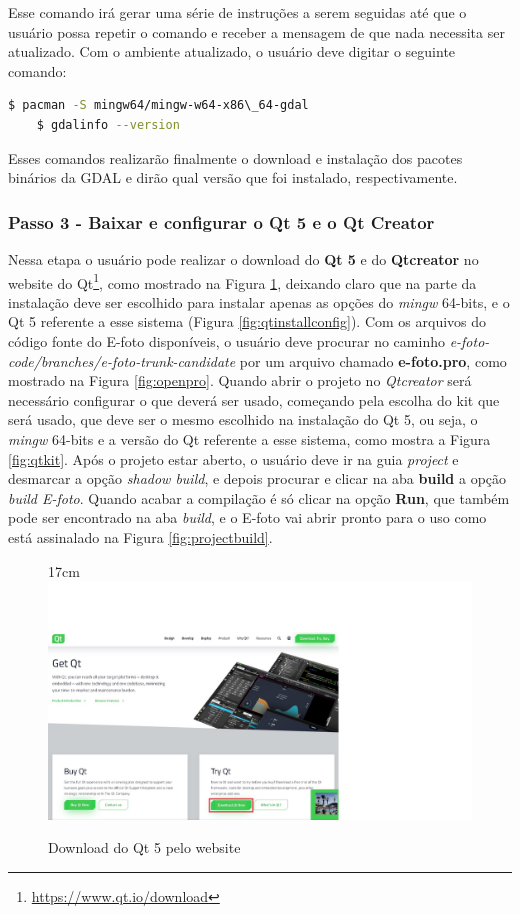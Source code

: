 Esse comando irá gerar uma série de instruções a serem seguidas até que o usuário possa repetir o comando e receber a mensagem de que nada necessita ser atualizado. Com o ambiente atualizado, o usuário deve digitar o seguinte comando:
\begin{lstlisting}[language=bash]
 	$ pacman -S mingw64/mingw-w64-x86\_64-gdal
 	$ gdalinfo --version
\end{lstlisting}

Esses comandos realizarão finalmente o download e instalação dos pacotes binários da GDAL e dirão qual versão que foi instalado, respectivamente. 
 
\subsubsection{Passo 3 - Baixar e configurar o Qt 5 e o Qt Creator}
Nessa etapa o usuário pode realizar o download do \textbf{Qt 5} e do \textbf{Qtcreator} no website do Qt\footnote{\url{https://www.qt.io/download}}, como mostrado na Figura \ref{fig:downqt}, deixando claro que na parte da instalação deve ser escolhido para instalar apenas as opções do \textit{mingw} 64-bits, e o Qt 5 referente a esse sistema (Figura \ref{fig:qtinstallconfig}). Com os arquivos do código fonte do E-foto disponíveis, o usuário deve procurar no caminho \textit{e-foto-code/branches/e-foto-trunk-candidate} por um arquivo chamado \textbf{e-foto.pro}, como mostrado na Figura \ref{fig:openpro}. Quando abrir o projeto no \textit{Qtcreator} será necessário configurar o que deverá ser usado, começando pela escolha do kit que será usado, que deve ser o mesmo escolhido na instalação do Qt 5, ou seja, o \textit{mingw} 64-bits e a versão do Qt referente a esse sistema, como mostra a Figura \ref{fig:qtkit}. Após o projeto estar aberto, o usuário deve ir na guia \textit{project} e desmarcar a opção \textit{shadow build}, e depois procurar e clicar na aba \textbf{build} a opção \textit{build E-foto}. Quando acabar a compilação é só clicar na opção \textbf{Run}, que também pode ser encontrado na aba \textit{build}, e o E-foto vai abrir pronto para o uso como está assinalado na Figura \ref{fig:projectbuild}.
\begin{figure}[!ht]{17cm}
  	\centering
 	\includegraphics[width=12cm]{Figuras/downqt.jpg}
 	\caption{Download do Qt 5 pelo website} \label{fig:downqt}
\end{figure}

